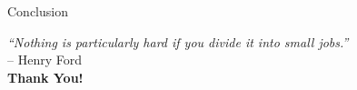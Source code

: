\documentclass[aspectratio=169]{beamer}
\begin{document}
\begin{frame}{Conclusion}
    \vspace{1cm}
    \begin{center}
        \Large \textcolor{maincolor}{\textit{``Nothing is particularly hard if you divide it into small jobs.''}} \\[0.5cm]
        \normalsize -- Henry Ford \\[1.5cm]
        
        \Huge \textbf{Thank You!} \\[0.5cm]
    \end{center}
\end{frame}
\end{document}
